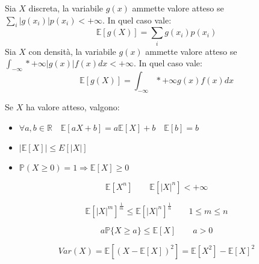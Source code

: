 \begin{proposition}
	Sia $X$ discreta, la variabile $g(x)$ ammette valore atteso se $\sum_i \lvert g(x_i) \rvert p(x_i) < +\infty$. In quel caso vale:
	\begin{equation}
		\mathbb{E}[g(X)] = \sum_i g(x_i)p(x_i)
	\end{equation}
	Sia $X$ con densità, la variabile $g(x)$ ammette valore atteso se $\int_{-\infty}*{+\infty} \lvert g(x) \rvert f(x) dx < +\infty$. In quel caso vale:
	\begin{equation}
		\mathbb{E}[g(X)] = \int_{-\infty}*{+\infty} g(x)f(x) dx
	\end{equation}
\end{proposition}
\begin{proposition}
	Se $X$ ha valore atteso, valgono:
	\begin{itemize}
		\item $\forall a,b \in \mathbb{R} \quad \mathbb{E}[aX+b] = a\mathbb{E}[X]+b \quad \mathbb{E}[b]=b$
		\item $\lvert \mathbb{E}[X] \rvert \leq E[\lvert X \rvert]$
		\item $\mathbb{P}(X \geq 0) = 1 \Longrightarrow \mathbb{E}[X] \geq 0$
	\end{itemize}
\end{proposition}

\begin{definition}
	\begin{equation}
		\mathbb{E}[X^n] \quad\quad \mathbb{E}[\lvert X \rvert ^n] < +\infty
	\end{equation}
\end{definition}

\begin{definition}
	\begin{equation}
		\mathbb{E}[\lvert X \rvert ^m] ^{\frac{1}{m}} \leq \mathbb{E}[\lvert X \rvert^n]^{\frac{1}{n}} \quad\quad 1 \leq m \leq n
	\end{equation}
\end{definition}

\begin{definition}
	\begin{equation}
		a\mathbb{P}\{X \geq a\}\leq \mathbb{E}[X] \quad\quad a>0
	\end{equation}
\end{definition}

\begin{definition}[Varianza]
	\begin{equation}
		Var(X) = \mathbb{E}[(X-\mathbb{E}[X])^2] = \mathbb{E}[X^2] - \mathbb{E}[X]^2
	\end{equation}
\end{definition}

